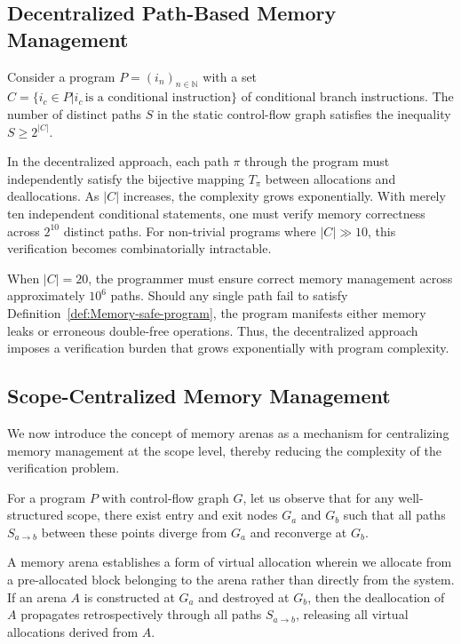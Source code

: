 \subsection{Decentralized Path-Based Memory Management}
\label{subsec:Decentralized-Path-Based-Memory-Management}

Consider a program $P = (i_n)_{n \in \mathbb{N}}$ with a set $C = \{i_c \in P | i_c\, \text{is a conditional instruction}\}$ of conditional branch instructions. The number of distinct paths $S$ in the static control-flow graph satisfies the inequality $S \geq 2^{|C|}$.

In the decentralized approach, each path $\pi$ through the program must independently satisfy the bijective mapping $T_{\pi}$ between allocations and deallocations. As $|C|$ increases, the complexity grows exponentially. With merely ten independent conditional statements, one must verify memory correctness across $2^{10}$ distinct paths. For non-trivial programs where $|C| \gg 10$, this verification becomes combinatorially intractable.

When $|C| = 20$, the programmer must ensure correct memory management across approximately $10^6$ paths. Should any single path fail to satisfy Definition~\ref{def:Memory-safe-program}, the program manifests either memory leaks or erroneous double-free operations. Thus, the decentralized approach imposes a verification burden that grows exponentially with program complexity.

\subsection{Scope-Centralized Memory Management}
\label{subsec:Scope-Centralized-Memory-Management}

We now introduce the concept of memory arenas as a mechanism for centralizing memory management at the scope level, thereby reducing the complexity of the verification problem.

For a program $P$ with control-flow graph $G$, let us observe that for any well-structured scope, there exist entry and exit nodes $G_a$ and $G_b$ such that all paths $S_{a \rightarrow b}$ between these points diverge from $G_a$ and reconverge at $G_b$.

\indent
\begin{raggedright}
	A memory arena establishes a form of virtual allocation wherein we allocate from a pre-allocated block belonging to the arena rather than directly from the system.
	If an arena $A$ is constructed at $G_a$ and destroyed at $G_b$, then the deallocation of $A$ propagates retrospectively through all paths $S_{a \rightarrow b}$,
	releasing all virtual allocations derived from $A$.
\end{raggedright}

